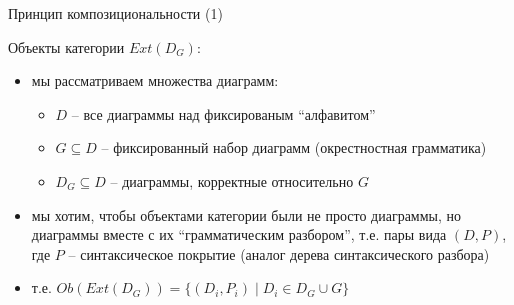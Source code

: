 \documentclass{beamer}
\begin{document}

\begin{frame}{Принцип композициональности (1)}
\begin{small}
Объекты категории $Ext(D_G)$:\\
\medskip
\begin{itemize}
	\item мы рассматриваем множества диаграмм:
		\begin{itemize}
			\item $D$ -- все диаграммы над фиксированым ``алфавитом''
			\item $G \subseteq D$ -- фиксированный набор диаграмм (окрестностная грамматика)
			\item $D_G \subseteq D$ -- диаграммы, корректные относительно $G$
		\end{itemize}
	\item мы хотим, чтобы объектами категории были не просто диаграммы, но диаграммы вместе с их ``грамматическим разбором'', т.е. пары вида $(D, P)$, где $P$ -- синтаксическое покрытие (аналог дерева синтаксического разбора)
	\item т.е. $Ob(Ext(D_G)) = \{ (D_i, P_i) \; \vert \; D_i \in D_G \cup G \}$
\end{itemize}
\end{small}
\end{frame}
\end{document}
